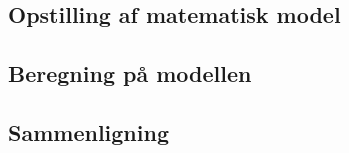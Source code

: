 \documentclass[SRC.tex]{subfiles}
\begin{document}
	\subsection{Opstilling af matematisk model}
	\subsection{Beregning på modellen}
	\subsection{Sammenligning}
\end{document}
